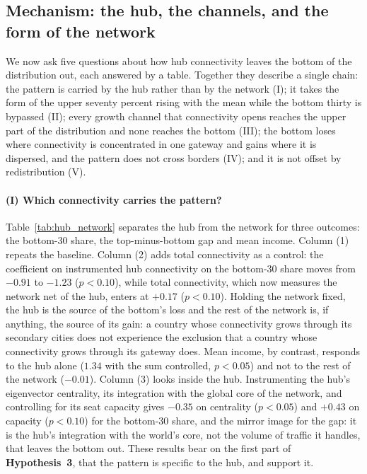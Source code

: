 \subsection{Mechanism: the hub, the channels, and the form of the network}
\label{sec:mechanism}
We now ask five questions about how hub connectivity leaves the bottom of the distribution out, each answered by a table. Together they describe a single chain: the pattern is carried by the hub rather than by the network (I); it takes the form of the upper seventy percent rising with the mean while the bottom thirty is bypassed (II); every growth channel that connectivity opens reaches the upper part of the distribution and none reaches the bottom (III); the bottom loses where connectivity is concentrated in one gateway and gains where it is dispersed, and the pattern does not cross borders (IV); and it is not offset by redistribution (V).

\paragraph{(I) Which connectivity carries the pattern?}
Table~\ref{tab:hub_network} separates the hub from the network for three outcomes: the bottom-30 share, the top-minus-bottom gap and mean income. Column (1) repeats the baseline. Column (2) adds total connectivity as a control: the coefficient on instrumented hub connectivity on the bottom-30 share moves from $-0.91$ to $-1.23$ ($p<0.10$), while total connectivity, which now measures the network net of the hub, enters at $+0.17$ ($p<0.10$). Holding the network fixed, the hub is the source of the bottom's loss and the rest of the network is, if anything, the source of its gain: a country whose connectivity grows through its secondary cities does not experience the exclusion that a country whose connectivity grows through its gateway does. Mean income, by contrast, responds to the hub alone ($1.34$ with the sum controlled, $p<0.05$) and not to the rest of the network ($-0.01$). Column (3) looks inside the hub. Instrumenting the hub's eigenvector centrality, its integration with the global core of the network, and controlling for its seat capacity gives $-0.35$ on centrality ($p<0.05$) and $+0.43$ on capacity ($p<0.10$) for the bottom-30 share, and the mirror image for the gap: it is the hub's integration with the world's core, not the volume of traffic it handles, that leaves the bottom out. These results bear on the first part of \textbf{Hypothesis~3}, that the pattern is specific to the hub, and support it.

